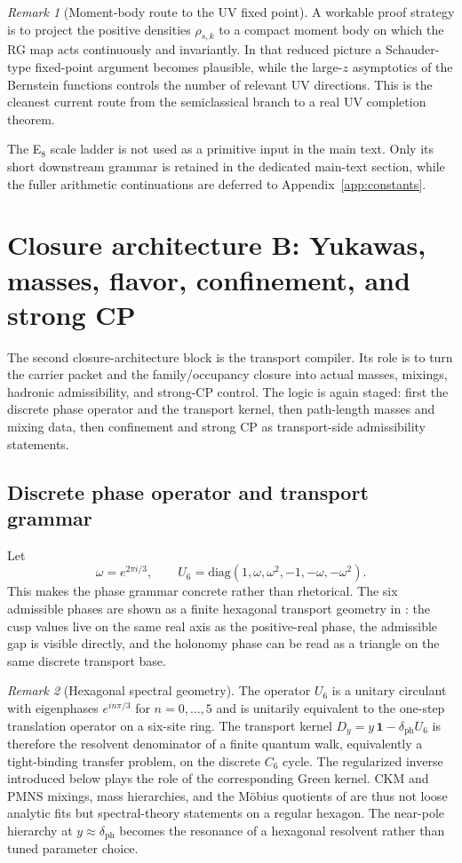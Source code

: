 \documentclass[11pt,a4paper]{article}
\theoremstyle{definition}
\theoremstyle{remark}
\newtheorem*{remark}{Remark}
\begin{document}
\begin{remark}[Moment-body route to the UV fixed point]
A workable proof strategy is to project the positive densities $\rho_{s,k}$ to a
compact moment body on which the RG map acts continuously and invariantly. In
that reduced picture a Schauder-type fixed-point argument becomes plausible,
while the large-$z$ asymptotics of the Bernstein functions controls the number of
relevant UV directions. This is the cleanest current route from the semiclassical
branch to a real UV completion theorem.
\end{remark}

The E$_8$ scale ladder is not used as a primitive input in the main text. Only its short downstream grammar is retained in the dedicated main-text section, while the fuller arithmetic continuations are deferred to Appendix~\ref{app:constants}.

\section{Closure architecture B: Yukawas, masses, flavor, confinement, and strong CP}

The second closure-architecture block is the transport compiler. Its role is to turn the carrier packet and the family/occupancy closure into actual masses, mixings, hadronic admissibility, and strong-CP control. The logic is again staged: first the discrete phase operator and the transport kernel, then path-length masses and mixing data, then confinement and strong CP as transport-side admissibility statements.

\subsection{Discrete phase operator and transport grammar}

Let
\[
\omega=e^{2\pi i/3},
\qquad
U_6=\mathrm{diag}(1,\omega,\omega^2,-1,-\omega,-\omega^2).
\]
This makes the phase grammar concrete rather than rhetorical. The six admissible phases are shown as a finite hexagonal transport geometry in : the cusp values live on the same real axis as the positive-real phase, the admissible gap is visible directly, and the holonomy phase can be read as a triangle on the same discrete transport base.

\begin{remark}[Hexagonal spectral geometry]
The operator $U_6$ is a unitary circulant with eigenphases $e^{in\pi/3}$ for $n=0,\dots,5$ and is unitarily equivalent to the one-step translation operator on a six-site ring. The transport kernel $D_y=y\,\mathbf 1-\delta_{\mathrm{ph}}U_6$ is therefore the resolvent denominator of a finite quantum walk, equivalently a tight-binding transfer problem, on the discrete $C_6$ cycle. The regularized inverse introduced below plays the role of the corresponding Green kernel. CKM and PMNS mixings, mass hierarchies, and the Möbius quotients of  are thus not loose analytic fits but spectral-theory statements on a regular hexagon. The near-pole hierarchy at $y\approx\delta_{\mathrm{ph}}$ becomes the resonance of a hexagonal resolvent rather than tuned parameter choice.
\end{remark}
\end{document}
